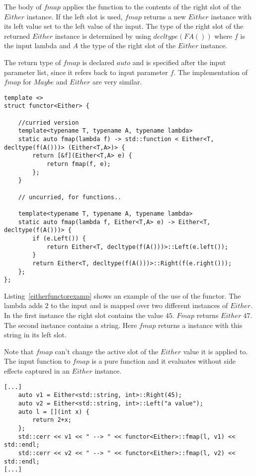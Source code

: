 \documentclass[12pt,fleqn]{article}
\begin{document}
The body of $fmap$ applies the function to the contents of the right slot of the $Either$ instance.
If the left slot is used, $fmap$ returns a new $Either$ instance with its left value set to the left value of the input.
The type of the right slot of the returned $Either$ instance is determined by using $decltype(FA())$ where $f$ is the input 
lambda and $A$ the type of the right slot of the $Either$ instance.

The return type of $fmap$ is declared $auto$ and is specified after the input parameter list, since it refers back to input parameter $f$.
The implementation of $fmap$ for $Maybe$ and $Either$ are very similar.

%
%
\begin{minipage}{\linewidth}
\begin{lstlisting}[caption=Either Functor,label=eitherfunctor]
template <>
struct functor<Either> {

	//curried version
	template<typename T, typename A, typename lambda>
	static auto fmap(lambda f) -> std::function < Either<T, decltype(f(A()))> (Either<T,A>)> {
		return [&f](Either<T,A> e) {
			return fmap(f, e);
		};
	}
	
	// uncurried, for functions..
	
	template<typename T, typename A, typename lambda>
	static auto fmap(lambda f, Either<T,A> e) -> Either<T, decltype(f(A()))> {
		if (e.Left()) {
			return Either<T, decltype(f(A()))>::Left(e.left());
		} 
		return Either<T, decltype(f(A()))>::Right(f(e.right()));
	};
};
\end{lstlisting}
\end{minipage}
%
%
%

Listing~\ref{eitherfunctorexamp} shows an example of the use of the functor.
The lambda adds $2$ to the input and is mapped over two different instances of $Either$.
In the first instance the right slot contains the value $45$.
$Fmap$ returns $Either \; 47$.
The second instance contains a string.
Here $fmap$ returns a instance with this string in its left slot.

Note that $fmap$ can't change the active slot of the $Either$ value it is applied to.
The input function to $fmap$ is a pure function and it evaluates without side effects captured in an $Either$ instance. 

%
%
\begin{minipage}{\linewidth}
\begin{lstlisting}[caption=Example of the Either functor,label=eitherfunctorexamp]
[...]
	auto v1 = Either<std::string, int>::Right(45);
	auto v2 = Either<std::string, int>::Left("a value");
	auto l = [](int x) {
		return 2+x;
	};
	std::cerr << v1 << " --> " << functor<Either>::fmap(l, v1) << std::endl;
	std::cerr << v2 << " --> " << functor<Either>::fmap(l, v2) << std::endl;
[...]
\end{lstlisting}
\end{minipage}
%
%
%
\end{document}
